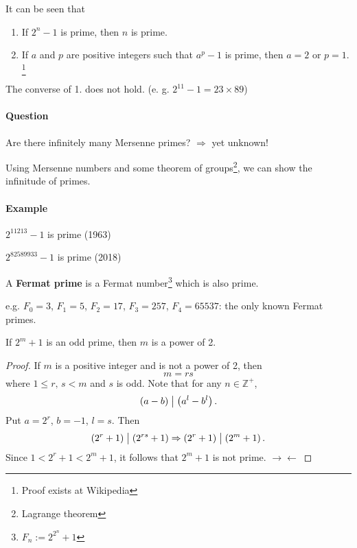 It can be seen that
\begin{enumerate}
    \item If $2^n-1$ is prime, then $n$ is prime.
    \item If $a$ and $p$ are positive integers such that $a^p-1$ is
    prime, then $a=2$ or $p=1$.
    \footnote{Proof exists at Wikipedia}
\end{enumerate}
The converse of 1. does not hold. (e. g. $2^{11}-1 = 23\times 89$)

\paragraph{Question} Are there infinitely many Mersenne primes?
$\Rightarrow$ yet unknown!

\begin{remark}
    Using Mersenne numbers and some theorem of groups\footnote{Lagrange theorem},
    we can show the infinitude of primes.
\end{remark}

\paragraph{Example} $2^{11213}-1$ is prime (1963)

$2^{82589933}-1$ is prime (2018)

\begin{definition}
    A \textbf{Fermat prime} is a Fermat number\footnote{$F_n := 2^{2^n} + 1$} which is also prime.
\end{definition}

e.g. $F_0=3$, $F_1=5$, $F_2=17$, $F_3=257$, $F_4=65537$: the only known Fermat primes.

\begin{theorem}
    If $2^m+1$ is an odd prime, then $m$ is a power of 2.     
\end{theorem}
\begin{proof}
    If $m$ is a positive integer and is not a power of 2, then
    \[
        m=rs    
    \]
    where $1 \leq r,\,s < m$ and $s$ is odd.
    Note that for any $n \in \mathbb{Z}^+$,
    \[
        \left(a-b\right) \bigm| \left(a^l-b^l\right).    
    \]
    Put $a=2^r$, $b=-1$, $l=s$. Then
    \[
        \left(2^r+1\right) \bigm| \left(2^{rs}+1\right)
        \Rightarrow \left(2^r+1\right) \bigm| \left(2^{m}+1\right).
    \]
    Since $1<2^r+1<2^m+1$, it follows that $2^m+1$ is not prime. $\rightarrow\leftarrow$
\end{proof}


